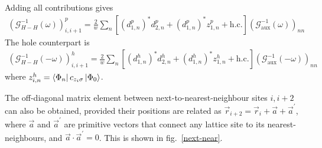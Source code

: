 \documentclass{report}
\numberwithin{equation}{section}
\begin{document}
Adding all contributions gives
\begin{equation}\begin{aligned}
	\left(\mathcal{G}^{-1}_{H-H}\left(\omega\right) \right)^p_{i,i+1} = \frac{2}{w} \sum_n \left[\left(d^p_{1,n}\right)^*d^p_{2,n} + \left(d^p_{1,n}\right)^* z^p_{1,n} + \text{h.c.}\right] \left(\mathcal{G}^{-1}_\text{aux}(\omega) \right)_{nn}
\end{aligned}\end{equation}
The hole counterpart is
\begin{equation}\begin{aligned}
	\left(\mathcal{G}^{-1}_{H-H}\left(-\omega\right) \right)^h_{i,i+1} = \frac{2}{w} \sum_n \left[\left(d^h_{1,n}\right)^*d^h_{2,n} + \left(d^h_{1,n}\right)^* z^h_{1,n} + \text{h.c.}\right] \left(\mathcal{G}^{-1}_\text{aux}(-\omega) \right)_{nn}
\end{aligned}\end{equation}
where \(z^h_{i,n} = \bra{\Phi_n}c_{z_i\sigma}\ket{\Phi_0}\).

The off-diagonal matrix element between next-to-nearest-neighbour sites \(i,i+2\) can also be obtained, provided their positions are related as \(\vec r_{i+2} = \vec r_i + \vec a + \vec a^\prime\), where \(\vec a\) and \(\vec a^\prime\) are primitive vectors that connect any lattice site to its nearest-neighbours, and \(\vec{a}\cdot\vec{a}^\prime = 0\). This is shown in fig.~\ref{next-near}. 
\end{document}

